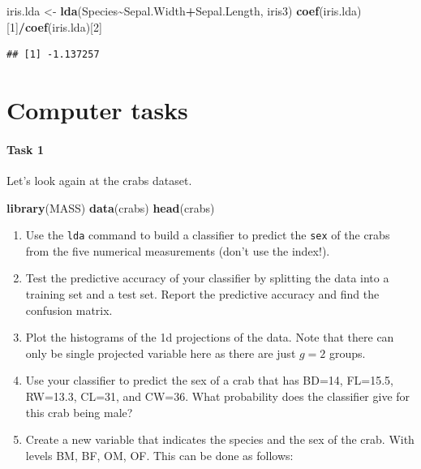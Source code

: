 \documentclass[
]{book}
\newenvironment{Shaded}{\begin{snugshade}}{\end{snugshade}}
\newcommand{\DecValTok}[1]{\textcolor[rgb]{0.00,0.00,0.81}{#1}}
\newcommand{\FunctionTok}[1]{\textcolor[rgb]{0.13,0.29,0.53}{\textbf{#1}}}
\newcommand{\NormalTok}[1]{#1}
\newcommand{\OtherTok}[1]{\textcolor[rgb]{0.56,0.35,0.01}{#1}}
\newcommand{\SpecialCharTok}[1]{\textcolor[rgb]{0.81,0.36,0.00}{\textbf{#1}}}
\theoremstyle{definition}
\theoremstyle{definition}
\theoremstyle{definition}
\theoremstyle{definition}
\theoremstyle{remark}
\begin{document}
\begin{Shaded}
\begin{Highlighting}[]
\NormalTok{iris.lda }\OtherTok{\textless{}{-}} \FunctionTok{lda}\NormalTok{(Species}\SpecialCharTok{\textasciitilde{}}\NormalTok{Sepal.Width}\SpecialCharTok{+}\NormalTok{Sepal.Length, iris3)}
\FunctionTok{coef}\NormalTok{(iris.lda)[}\DecValTok{1}\NormalTok{]}\SpecialCharTok{/}\FunctionTok{coef}\NormalTok{(iris.lda)[}\DecValTok{2}\NormalTok{]}
\end{Highlighting}
\end{Shaded}

\begin{verbatim}
## [1] -1.137257
\end{verbatim}

\hypertarget{computer-tasks-4}{%
\section{Computer tasks}\label{computer-tasks-4}}

\hypertarget{task-1-3}{%
\paragraph*{Task 1}\label{task-1-3}}

Let's look again at the crabs dataset.

\begin{Shaded}
\begin{Highlighting}[]
\FunctionTok{library}\NormalTok{(MASS)}
\FunctionTok{data}\NormalTok{(crabs)}
\FunctionTok{head}\NormalTok{(crabs)}
\end{Highlighting}
\end{Shaded}

\begin{enumerate}
\def\labelenumi{\roman{enumi}.}
\item
  Use the \texttt{lda} command to build a classifier to predict the \texttt{sex} of the crabs from the
  five numerical measurements (don't use the index!).
\item
  Test the predictive accuracy of your classifier by splitting the data into a training set and a test set. Report the predictive accuracy and find the confusion matrix.
\item
  Plot the histograms of the 1d projections of the data. Note that there can only be single projected variable here as there are just \(g=2\) groups.
\item
  Use your classifier to predict the sex of a crab that has BD=14, FL=15.5, RW=13.3, CL=31, and CW=36. What probability does the classifier give for this crab being male?
\item
  Create a new variable that indicates the species and the sex of the crab. With levels
  BM, BF, OM, OF. This can be done as follows:
\end{enumerate}
\end{document}
